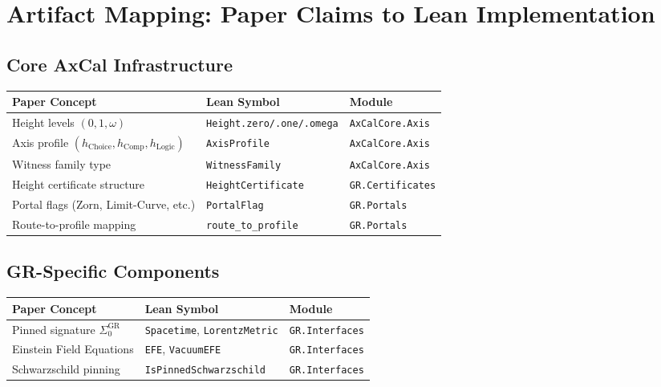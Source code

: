 \documentclass[11pt]{article}
\theoremstyle{definition}
\theoremstyle{remark}
\newcommand{\hChoice}{h_{\mathrm{Choice}}}    %
\newcommand{\hComp}{h_{\mathrm{Comp}}}        %
\newcommand{\hLogic}{h_{\mathrm{Logic}}}      %
\begin{document}
\section{Artifact Mapping: Paper Claims to Lean Implementation}

\subsection{Core AxCal Infrastructure}

\begin{center}
\small
\begin{tabular}{|p{5cm}|p{5.5cm}|p{4cm}|}
\hline
\textbf{Paper Concept} & \textbf{Lean Symbol} & \textbf{Module} \\
\hline
Height levels $(0, 1, \omega)$ & \texttt{Height.zero/.one/.omega} & \texttt{AxCalCore.Axis} \\
\hline
Axis profile $(\hChoice, \hComp, \hLogic)$ & \texttt{AxisProfile} & \texttt{AxCalCore.Axis} \\
\hline
Witness family type & \texttt{WitnessFamily} & \texttt{AxCalCore.Axis} \\
\hline
Height certificate structure & \texttt{HeightCertificate} & \texttt{GR.Certificates} \\
\hline
Portal flags (Zorn, Limit-Curve, etc.) & \texttt{PortalFlag} & \texttt{GR.Portals} \\
\hline
Route-to-profile mapping & \texttt{route\_to\_profile} & \texttt{GR.Portals} \\
\hline
\end{tabular}
\end{center}

\subsection{GR-Specific Components}

\begin{center}
\small
\begin{tabular}{|p{5cm}|p{5.5cm}|p{4cm}|}
\hline
\textbf{Paper Concept} & \textbf{Lean Symbol} & \textbf{Module} \\
\hline
Pinned signature $\Sigma_0^{\mathrm{GR}}$ & \texttt{Spacetime}, \texttt{LorentzMetric} & \texttt{GR.Interfaces} \\
\hline
Einstein Field Equations & \texttt{EFE}, \texttt{VacuumEFE} & \texttt{GR.Interfaces} \\
\hline
Schwarzschild pinning & \texttt{IsPinnedSchwarzschild} & \texttt{GR.Interfaces} \\
\hline
\end{tabular}
\end{center}
\end{document}
